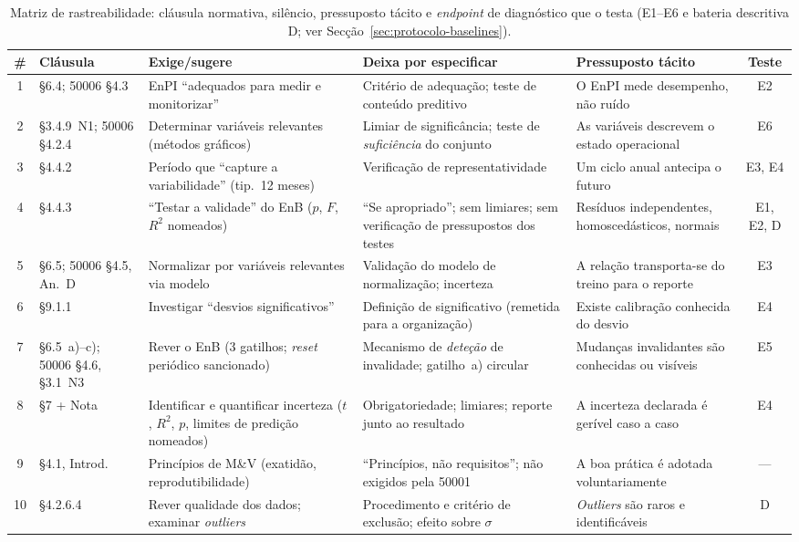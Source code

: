 \begin{table}[htbp]
  \centering\footnotesize
  \caption[Matriz de rastreabilidade cláusula--silêncio--pressuposto--teste]{Matriz de rastreabilidade: cláusula normativa, silêncio, pressuposto tácito e \emph{endpoint} de diagnóstico que o testa (E1--E6 e bateria descritiva D; ver Secção~\ref{sec:protocolo-baselines}).}
  \label{tab:matriz-rastreabilidade}
  \begin{tabularx}{\textwidth}{@{}c >{\raggedright\arraybackslash}p{2.1cm} X X X c@{}}
    \toprule
    \# & \textbf{Cláusula} & \textbf{Exige/sugere} & \textbf{Deixa por especificar} & \textbf{Pressuposto tácito} & \textbf{Teste} \\
    \midrule
    1 & 50001 \S6.4; 50006 \S4.3 & EnPI \enquote{adequados para medir e monitorizar} & Critério de adequação; teste de conteúdo preditivo & O EnPI mede desempenho, não ruído & E2 \\
    2 & 50001 \S3.4.9~N1; 50006 \S4.2.4 & Determinar variáveis relevantes (métodos gráficos) & Limiar de significância; teste de \emph{suficiência} do conjunto & As variáveis descrevem o estado operacional & E6 \\
    3 & 50006 \S4.4.2 & Período que \enquote{capture a variabilidade} (tip.\ 12 meses) & Verificação de representatividade & Um ciclo anual antecipa o futuro & E3, E4 \\
    4 & 50006 \S4.4.3 & \enquote{Testar a validade} do EnB ($p$, $F$, $R^2$ nomeados) & \enquote{Se apropriado}; sem limiares; sem verificação de pressupostos dos testes & Resíduos independentes, homoscedásticos, normais & E1, E2, D \\
    5 & 50001 \S6.5; 50006 \S4.5, An.~D & Normalizar por variáveis relevantes via modelo & Validação do modelo de normalização; incerteza & A relação transporta-se do treino para o reporte & E3 \\
    6 & 50001 \S9.1.1 & Investigar \enquote{desvios significativos} & Definição de significativo (remetida para a organização) & Existe calibração conhecida do desvio & E4 \\
    7 & 50001 \S6.5~a)--c); 50006 \S4.6, \S3.1~N3 & Rever o EnB (3 gatilhos; \emph{reset} periódico sancionado) & Mecanismo de \emph{deteção} de invalidade; gatilho~a) circular & Mudanças invalidantes são conhecidas ou visíveis & E5 \\
    8 & 50015 \S7 + Nota & Identificar e quantificar incerteza ($t$, $R^2$, $p$, limites de predição nomeados) & Obrigatoriedade; limiares; reporte junto ao resultado & A incerteza declarada é gerível caso a caso & E4 \\
    9 & 50015 \S4.1, Introd. & Princípios de M\&V (exatidão, reprodutibilidade) & \enquote{Princípios, não requisitos}; não exigidos pela 50001 & A boa prática é adotada voluntariamente & --- \\
    10 & 50006 \S4.2.6.4 & Rever qualidade dos dados; examinar \emph{outliers} & Procedimento e critério de exclusão; efeito sobre $\sigma$ & \emph{Outliers} são raros e identificáveis & D \\
    \bottomrule
  \end{tabularx}
\end{table}

